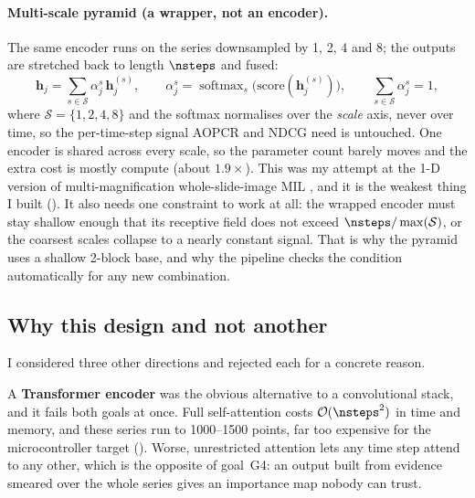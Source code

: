 \paragraph{Multi-scale pyramid (a wrapper, not an encoder).}
The same encoder runs on the series downsampled by 1, 2, 4 and 8; the outputs are stretched back to
length $\nsteps$ and fused:
\begin{equation}
  \mathbf{h}_j = \sum_{s \in \mathcal{S}} \alpha_j^{s} \, \mathbf{h}_j^{(s)} ,
  \qquad
  \alpha_j^{s} = \operatorname{softmax}_{s}\big(\text{score}(\mathbf{h}_j^{(s)})\big),
  \qquad \sum_{s \in \mathcal{S}} \alpha_j^{s} = 1 ,
  \label{eq:pyramid_fusion}
\end{equation}
where $\mathcal{S} = \{1,2,4,8\}$ and the softmax normalises over the \emph{scale} axis, never over
time, so the per-time-step signal AOPCR and NDCG need is untouched. One encoder is shared across
every scale, so the parameter count barely moves and the extra cost is mostly compute (about
$1.9\times$). This was my attempt at the 1-D version of multi-magnification whole-slide-image MIL
\citep{hashimoto2020msdamil}, and it is the weakest thing I built (). It
also needs one constraint to work at all: the wrapped encoder must stay shallow enough that its
receptive field does not exceed $\nsteps / \max(\mathcal{S})$, or the coarsest scales collapse to a
nearly constant signal. That is why the pyramid uses a shallow 2-block base, and why the pipeline
checks the condition automatically for any new combination.


\subsection{Why this design and not another}
\label{sec:arch:why}

I considered three other directions and rejected each for a concrete reason.

A \textbf{Transformer encoder} was the obvious alternative to a convolutional stack, and it fails
both goals at once. Full self-attention costs $\mathcal{O}(\nsteps^2)$ in time and memory, and these
series run to 1000--1500 points, far too expensive for the microcontroller target
(). Worse, unrestricted attention lets any time step attend to any other, which is
the opposite of goal~G4: an output built from evidence smeared over the whole series gives an
importance map nobody can trust.

